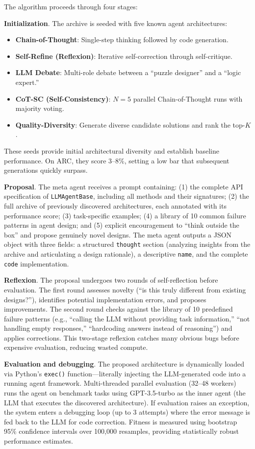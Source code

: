 The algorithm proceeds through four stages:

\textbf{Initialization}. The archive is seeded with five known agent architectures:
\begin{itemize}
\item \textbf{Chain-of-Thought}: Single-step thinking followed by code generation.
\item \textbf{Self-Refine (Reflexion)}: Iterative self-correction through self-critique.
\item \textbf{LLM Debate}: Multi-role debate between a ``puzzle designer'' and a ``logic expert.''
\item \textbf{CoT-SC (Self-Consistency)}: $N{=}5$ parallel Chain-of-Thought runs with majority voting.
\item \textbf{Quality-Diversity}: Generate diverse candidate solutions and rank the top-$K$.
\end{itemize}

These seeds provide initial architectural diversity and establish baseline performance. On ARC, they score 3--8\%, setting a low bar that subsequent generations quickly surpass.

\textbf{Proposal}. The meta agent receives a prompt containing: (1) the complete API specification of \texttt{LLMAgentBase}, including all methods and their signatures; (2) the full archive of previously discovered architectures, each annotated with its performance score; (3) task-specific examples; (4) a library of 10 common failure patterns in agent design; and (5) explicit encouragement to ``think outside the box'' and propose genuinely novel designs. The meta agent outputs a JSON object with three fields: a structured \texttt{thought} section (analyzing insights from the archive and articulating a design rationale), a descriptive \texttt{name}, and the complete \texttt{code} implementation.

\textbf{Reflexion}. The proposal undergoes two rounds of self-reflection before evaluation. The first round assesses novelty (``is this truly different from existing designs?''), identifies potential implementation errors, and proposes improvements. The second round checks against the library of 10 predefined failure patterns (e.g., ``calling the LLM without providing task information,'' ``not handling empty responses,'' ``hardcoding answers instead of reasoning'') and applies corrections. This two-stage reflexion catches many obvious bugs before expensive evaluation, reducing wasted compute.

\textbf{Evaluation and debugging}. The proposed architecture is dynamically loaded via Python's \texttt{exec()} function---literally injecting the LLM-generated code into a running agent framework. Multi-threaded parallel evaluation (32--48 workers) runs the agent on benchmark tasks using GPT-3.5-turbo as the inner agent (the LLM that executes the discovered architecture). If evaluation raises an exception, the system enters a debugging loop (up to 3 attempts) where the error message is fed back to the LLM for code correction. Fitness is measured using bootstrap 95\% confidence intervals over 100,000 resamples, providing statistically robust performance estimates.

